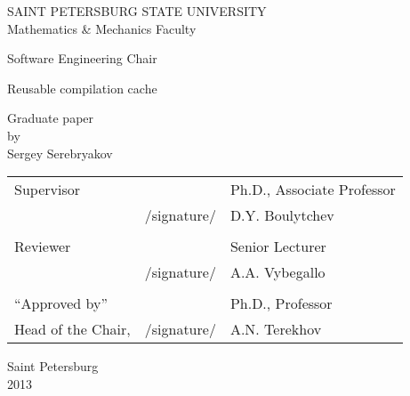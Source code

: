 %
%
\thispagestyle{empty}
\begin{center}
SAINT PETERSBURG STATE UNIVERSITY\\
Mathematics \& Mechanics Faculty\\
\end{center}

\begin{center}
Software Engineering Chair\\
\end{center}
\vspace{2cm}
\begin{center}
    \LARGE{Reusable compilation cache} \\
\end{center}
\vspace{1cm}
\begin{center}
    \normalsize{Graduate paper} \\
	\normalsize{by} \\
    \large{Sergey Serebryakov}
\end{center}
\vspace{3cm}
\noindent
\begin{center}
    \small
    \begin{tabular}{lcl}
        Supervisor & \dotuline{\phantom{место для подписи}} & Ph.D., Associate Professor\\
        & /signature/ & D.Y. Boulytchev\\\\
        Reviewer & \dotuline{\phantom{место для подписи}} & Senior Lecturer\\
        & /signature/& A.A. Vybegallo\\\\
        ``Approved by'' & \dotuline{\phantom{место для подписи}} & Ph.D., Professor\\
        Head of the Chair, & /signature/& A.N. Terekhov\\
    \end{tabular}
\end{center}
\vspace{\fill}
\begin{center}
    \small
    Saint Petersburg\\2013
\end{center}
